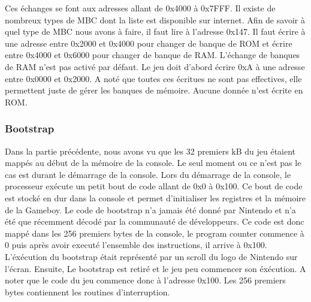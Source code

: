 \documentclass[a4paper]{article}
\begin{document}
Ces échanges se font aux adresses allant de 0x4000 à 0x7FFF. Il existe de nombreux 
types de MBC dont la liste est disponible sur internet. Afin de savoir à quel type 
de MBC nous avons à faire, il faut lire à l'adresse 0x147. Il faut écrire à une 
adresse entre 0x2000 et 0x4000 pour changer de banque de ROM et écrire entre 0x4000 
et 0x6000 pour changer de banque de RAM. L'échange de banques de RAM n'est pas activé 
par défaut. Le jeu doit d'abord écrire 0xA à une adresse entre 0x0000 et 0x2000. 
A noté que toutes ces écritues ne sont pas effectives, elle permettent juste de 
gérer les banques de mémoire. Aucune donnée n'est écrite en ROM.

\newpage

\subsubsection{Bootstrap}
Dans la partie précédente, nous avons vu que les 32 premiers kB du jeu étaient mappés
au début de la mémoire de la console. Le seul moment ou ce n'est pas le cas est 
durant le démarrage de la console. Lors du démarrage de la console, le processeur
exécute un petit bout de code allant de 0x0 à 0x100. Ce bout de code est stocké en
dur dans la console et permet d'initialiser les registres et la mémoire de la Gameboy.
Le code de bootstrap n'a jamais été donné par Nintendo et n'a été que récemment
décodé par la communauté de développeurs. Ce code est donc mappé dans les 256 premiers
bytes de la console, le program counter commence à 0 puis après avoir executé l'ensemble
des instructions, il arrive à 0x100. L'éxécution du bootstrap était représenté par
un scroll du logo de Nintendo sur l'écran. Ensuite, Le bootstrap est retiré et le jeu peu
commencer son éxécution. A noter que le code du jeu commence donc à l'adresse
0x100. Les 256 premiers bytes contiennent les routines d'interruption.
\newline
\end{document}
